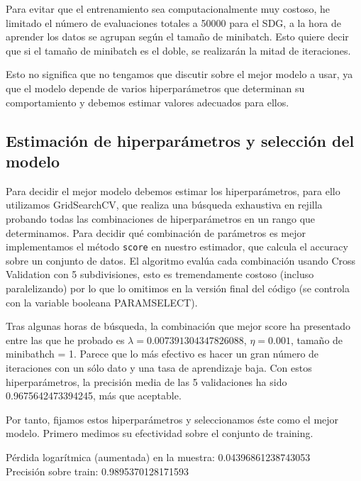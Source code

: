 \documentclass[a4]{article}
\begin{document}
Para evitar que el entrenamiento sea computacionalmente muy costoso,
he limitado el número de evaluaciones totales a 50000 para el SDG, a
la hora de aprender los datos se agrupan según el tamaño de
minibatch. Esto quiere decir que si el tamaño de minibatch es el
doble, se realizarán la mitad de iteraciones.

Esto no significa que no tengamos que discutir sobre el mejor modelo a
usar, ya que el modelo depende de varios hiperparámetros que
determinan su comportamiento y debemos estimar valores adecuados para
ellos.

\subsection{Estimación de hiperparámetros y selección del modelo}

Para decidir el mejor modelo debemos estimar los hiperparámetros, para
ello utilizamos GridSearchCV, que realiza una búsqueda exhaustiva en
rejilla probando todas las combinaciones de hiperparámetros en un
rango que determinamos. Para decidir qué combinación de parámetros es
mejor implementamos el método \texttt{score} en nuestro estimador, que
calcula el accuracy sobre un conjunto de datos. El algoritmo evalúa
cada combinación usando Cross Validation con 5 subdivisiones, esto es
tremendamente costoso (incluso paralelizando) por lo que lo omitimos
en la versión final del código (se controla con la variable booleana
PARAMSELECT).

Tras algunas horas de búsqueda, la combinación que mejor score ha
presentado entre las que he probado es $\lambda=0.007391304347826088$,
$\eta=0.001$, tamaño de minibathch = 1. Parece que lo más efectivo es
hacer un gran número de iteraciones con un sólo dato y una tasa de
aprendizaje baja. Con estos hiperparámetros, la precisión media de las
5 validaciones ha sido 0.9675642473394245, más que aceptable.

Por tanto, fijamos estos hiperparámetros y seleccionamos éste como el
mejor modelo. Primero medimos su efectividad sobre el conjunto de
training.

Pérdida logarítmica (aumentada) en la muestra: 0.04396861238743053 \\
Precisión sobre train: 0.9895370128171593
\end{document}
